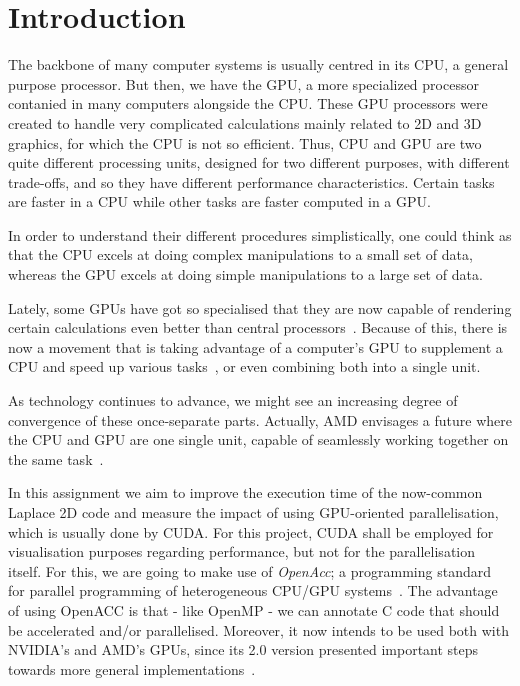 \section{Introduction}

The backbone of many computer systems is usually centred in its CPU, a general purpose processor. But then, we have the GPU, a more specialized processor contanied in many computers alongside the CPU. These GPU processors were created to handle very complicated calculations mainly related to 2D and 3D graphics, for which the CPU is not so efficient. Thus, CPU and GPU are two quite different processing units, designed for two different purposes, with different trade-offs, and so they have different performance characteristics. Certain tasks are faster in a CPU while other tasks are faster computed in a GPU.

In order to understand their different procedures simplistically, one could think as that the CPU excels at doing complex manipulations to a small set of data, whereas the GPU excels at doing simple manipulations to a large set of data.

Lately, some GPUs have got so specialised that they are now capable of rendering certain calculations even better than central processors~\cite{a:shuai-gpgpu}. Because of this, there is now a movement that is taking advantage of a computer's GPU to supplement a CPU and speed up various tasks~\cite{a:fung-gpgpu}, or even combining both into a single unit.

As technology continues to advance, we might see an increasing degree of convergence of these once-separate parts. Actually, AMD envisages a future where the CPU and GPU are one single unit, capable of seamlessly working together on the same task~\cite{o:hsa-amd}.

In this assignment we aim to improve the execution time of the now-common Laplace 2D code and measure the impact of using GPU-oriented parallelisation, which is usually done by CUDA. For this project, CUDA shall be employed for visualisation purposes regarding performance, but not for the parallelisation itself. For this, we are going to make use of \emph{OpenAcc}; a programming standard for parallel programming of heterogeneous CPU/GPU systems~\cite{o:openacc-std}. The advantage of using OpenACC is that - like OpenMP - we can annotate C code that should be accelerated and/or parallelised. Moreover, it now intends to be used both with NVIDIA's and AMD's GPUs, since its 2.0 version presented important steps towards more general implementations~\cite{o:openacc-amd}.


